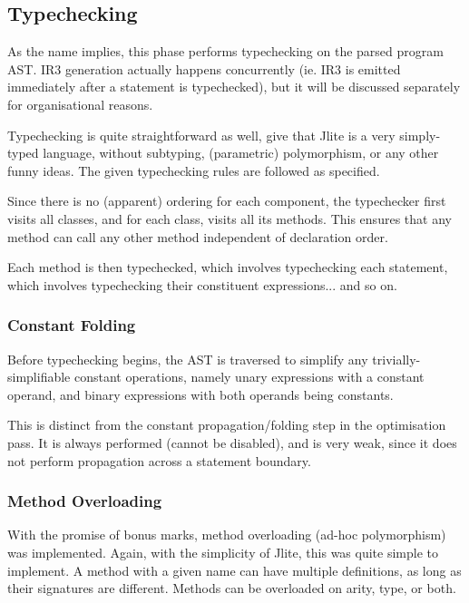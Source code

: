 \documentclass[12pt]{article}
\begin{document}


\subsection{Typechecking}

As the name implies, this phase performs typechecking on the parsed program AST. IR3 generation actually happens
concurrently (ie. IR3 is emitted immediately after a statement is typechecked), but it will be discussed separately
for organisational reasons.

Typechecking is quite straightforward as well, give that Jlite is a very simply-typed language, without subtyping,
(parametric) polymorphism, or any other funny ideas. The given typechecking rules are followed as specified.

Since there is no (apparent) ordering for each component, the typechecker first visits all classes, and for each class,
visits all its methods. This ensures that any method can call any other method independent of declaration order.

Each method is then typechecked, which involves typechecking each statement, which involves typechecking their
constituent expressions... and so on.


\subsubsection{Constant Folding}

Before typechecking begins, the AST is traversed to simplify any trivially-simplifiable constant operations,
namely unary expressions with a constant operand, and binary expressions with both operands being constants.

This is distinct from the constant propagation/folding step in the optimisation pass. It is always performed
(cannot be disabled), and is very weak, since it does not perform propagation across a statement boundary.




\subsubsection{Method Overloading}

With the promise of bonus marks, method overloading (ad-hoc polymorphism) was implemented. Again, with the
simplicity of Jlite, this was quite simple to implement. A method with a given name can have multiple
definitions, as long as their signatures are different. Methods can be overloaded on arity, type, or both.
\end{document}
